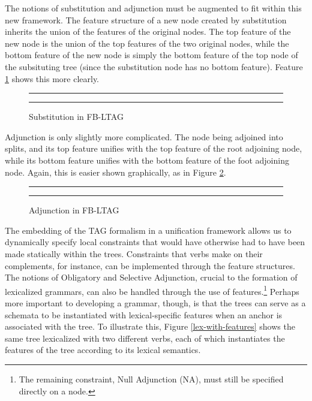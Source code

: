 The notions of substitution and adjunction must be augmented to fit within this
new framework.  The feature structure of a new node created by substitution
inherits the union of the features of the original nodes.  The top feature of
the new node is the union of the top features of the two original nodes, while
the bottom feature of the new node is simply the bottom feature of the top node
of the subsituting tree (since the substitution node has no bottom feature).
Feature \ref{subst-fig} shows this more clearly.

\begin{figure}[ht]
\centering
\rule[.1in]{\textwidth}{0.01in} 
\caption{Substitution in FB-LTAG}
\rule[.1in]{\textwidth}{0.01in} 
\label{subst-fig}
\end{figure}

Adjunction is only slightly more complicated.  The node being adjoined into
splits, and its top feature unifies with the top feature of the root
adjoining node, while its bottom feature unifies with the bottom feature of the
foot adjoining node.  Again, this is easier shown graphically, as in Figure
\ref{adjunct-fig}.

\begin{figure}[ht]
\centering
\rule[.1in]{\textwidth}{0.01in} 
\caption{Adjunction in FB-LTAG}
\label{adjunct-fig}
\rule[.1in]{\textwidth}{0.01in} 
\end{figure}


The embedding of the TAG formalism in a unification framework allows
us to dynamically specify local constraints that would have otherwise
had to have been made statically within the trees.  Constraints that
verbs make on their complements, for instance, can be implemented
through the feature structures.  The notions of Obligatory and
Selective Adjunction, crucial to the formation of lexicalized
grammars, can also be handled through the use of
features.\footnote{The remaining constraint, Null Adjunction (NA),
must still be specified directly on a node.} Perhaps more important to
developing a grammar, though, is that the trees can serve as a
schemata to be instantiated with lexical-specific features when an
anchor is associated with the tree.  To illustrate this, Figure
\ref{lex-with-features} shows the same tree lexicalized with two
different verbs, each of which instantiates the features of the tree
according to its lexical semantics.

